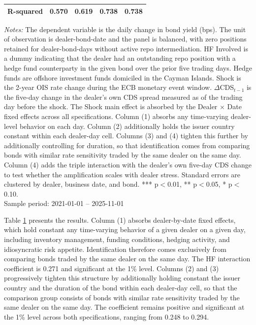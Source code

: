 \documentclass[english, 11pt, oneside]{article}
\begin{document}
\begin{table}[t]
\begin{tabular}{l c c c c}
R-squared & 0.570 & 0.619 & 0.738 & 0.738 \\
\bottomrule
\end{tabular}
\label{tab:dealer_robustness}
\vspace{1ex}
\begin{minipage}{\textwidth}
\scriptsize
\textit{Notes:} The dependent variable is the daily change in bond yield (bps). The unit of observation is dealer-bond-date and the panel is balanced, with zero positions retained for dealer-bond-days without active repo intermediation. HF Involved is a dummy indicating that the dealer had an outstanding repo position with a hedge fund counterparty in the given bond over the prior five trading days. Hedge funds are offshore investment funds domiciled in the Cayman Islands. Shock is the 2-year OIS rate change during the ECB monetary event window. $\Delta$CDS$_{t-1}$ is the five-day change in the dealer's own CDS spread measured as of the trading day before the shock. The Shock main effect is absorbed by the Dealer $\times$ Date fixed effects across all specifications. Column (1) absorbs any time-varying dealer-level behavior on each day. Column (2) additionally holds the issuer country constant within each dealer-day cell. Columns (3) and (4) tighten this further by additionally controlling for duration, so that identification comes from comparing bonds with similar rate sensitivity traded by the same dealer on the same day. Column (4) adds the triple interaction with the dealer's own five-day CDS change to test whether the amplification scales with dealer stress. Standard errors are clustered by dealer, business date, and bond. *** p$<$0.01, ** p$<$0.05, * p$<$0.10. \\ Sample period: 2021-01-01 -- 2025-11-01
\end{minipage}
\end{table}

Table \ref{tab:dealer_robustness} presents the results. Column (1) absorbs dealer-by-date fixed effects, which hold constant any time-varying behavior of a given dealer on a given day, including inventory management, funding conditions, hedging activity, and idiosyncratic risk appetite. Identification therefore comes exclusively from comparing bonds traded by the same dealer on the same day. The HF interaction coefficient is 0.271 and significant at the 1\% level. Columns (2) and (3) progressively tighten this structure by additionally holding constant the issuer country and the duration of the bond within each dealer-day cell, so that the comparison group consists of bonds with similar rate sensitivity traded by the same dealer on the same day. The coefficient remains positive and significant at the 1\% level across both specifications, ranging from 0.248 to 0.294.
\end{document}

